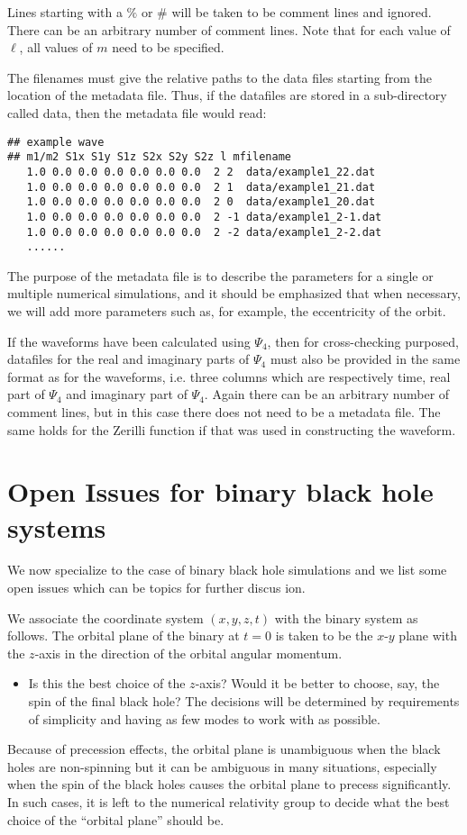\documentclass[10pt]{ligodcc}
\renewcommand{\texttt}[1]{{\ttfamily\color{blue}#1}}
\begin{document}
Lines starting with a $\%$ or $\#$ will be taken to be comment lines and
ignored.  There can be an arbitrary number of comment lines.  Note
that for each value of $\ell$, all values of $m$ need to be specified.

The filenames must give the relative paths to the data files starting
from the location of the metadata file.  Thus, if the datafiles are
stored in a sub-directory called \texttt{data}, then the metadata file
would read:
\begin{verbatim}
## example wave
## m1/m2 S1x S1y S1z S2x S2y S2z l mfilename     
   1.0 0.0 0.0 0.0 0.0 0.0 0.0  2 2  data/example1_22.dat
   1.0 0.0 0.0 0.0 0.0 0.0 0.0  2 1  data/example1_21.dat
   1.0 0.0 0.0 0.0 0.0 0.0 0.0  2 0  data/example1_20.dat
   1.0 0.0 0.0 0.0 0.0 0.0 0.0  2 -1 data/example1_2-1.dat
   1.0 0.0 0.0 0.0 0.0 0.0 0.0  2 -2 data/example1_2-2.dat
   ......
\end{verbatim}
The purpose of the metadata file is to describe the parameters for a
single or multiple numerical simulations, and it should be emphasized
that when necessary, we will add more parameters such as, for example,
the eccentricity of the orbit.

If the waveforms have been calculated using $\Psi_4$, then for
cross-checking purposed, datafiles for the real and imaginary parts of
$\Psi_4$ must also be provided in the same format as for the
waveforms, i.e. three columns which are respectively time, real part
of $\Psi_4$ and imaginary part of $\Psi_4$.  Again there can be an
arbitrary number of comment lines, but in this case there does not
need to be a metadata file.  The same holds for the Zerilli function
if that was used in constructing the waveform. 


\section{Open Issues for binary black hole systems}
\label{sec:openissues}

We now specialize to the case of binary black hole simulations and we
list some open issues which can be topics for further discus ion.  

We associate the coordinate system $(x,y,z,t)$ with the binary system
as follows.  The orbital plane of the binary at $t=0$ is taken to be
the $x$-$y$ plane with the $z$-axis in the direction of the orbital
angular momentum.
\begin{itemize}
\item Is this the best choice of the $z$-axis?  Would it be better to
  choose, say, the spin of the final black hole? The decisions will be
  determined by requirements of simplicity and having as few modes to
  work with as possible.  
\end{itemize}
Because of precession effects, the orbital plane is unambiguous when
the black holes are non-spinning but it can be ambiguous in many
situations, especially when the spin of the black holes causes the
orbital plane to precess significantly.  In such cases, it is left to
the numerical relativity group to decide what the best choice of the
``orbital plane'' should be.
\end{document}

